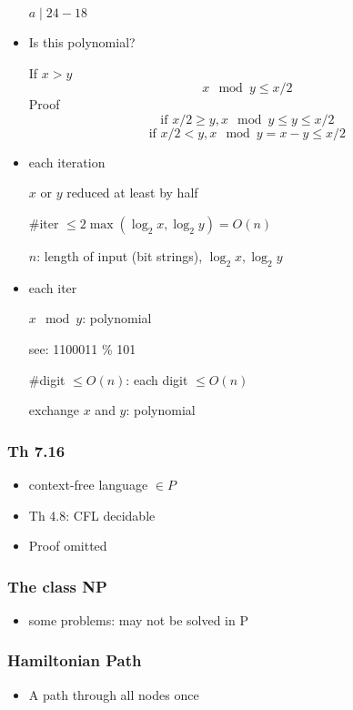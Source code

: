 \begin{frame}[allowframebreaks]
\begin{itemize}
$a \mid  24-18$
\item 

Is this polynomial?

If $x > y$
\begin{equation*}
  x \mod y \leq x/2
\end{equation*}
Proof
\begin{equation*}
  \mbox{if } x/2 \geq y, x \mod y \leq y \leq x/2
\end{equation*}
\begin{equation*}
  \mbox{if } x/2 < y, x \mod y = x-y \leq x/2
\end{equation*}
\item each iteration

$x$ or $y$ reduced at least by half 

\#iter $\leq 2\max(\log_2 x, \log_2 y)= O(n)$

$n$: length of input (bit strings), $\log_2 x, \log_2 y$
\item each iter

$x \mod y$:  polynomial

see: 1100011 \% 101

\#digit $\leq O(n)$: each digit $\leq O(n)$

exchange $x$ and $y$: polynomial

\end{itemize}\end{frame} \begin{frame}[allowframebreaks] \frametitle{Th 7.16}
  \begin{itemize}
\item context-free language $\in P$

\item Th 4.8: CFL decidable

\item Proof omitted
\end{itemize}\end{frame} \begin{frame}[allowframebreaks] \frametitle{The class NP}
  \begin{itemize}
\item some problems: may not be solved in P

\end{itemize}\end{frame} \begin{frame}[allowframebreaks] \frametitle{Hamiltonian Path}
  \begin{itemize}
\item A path through all nodes once


\end{itemize}
\end{frame}
